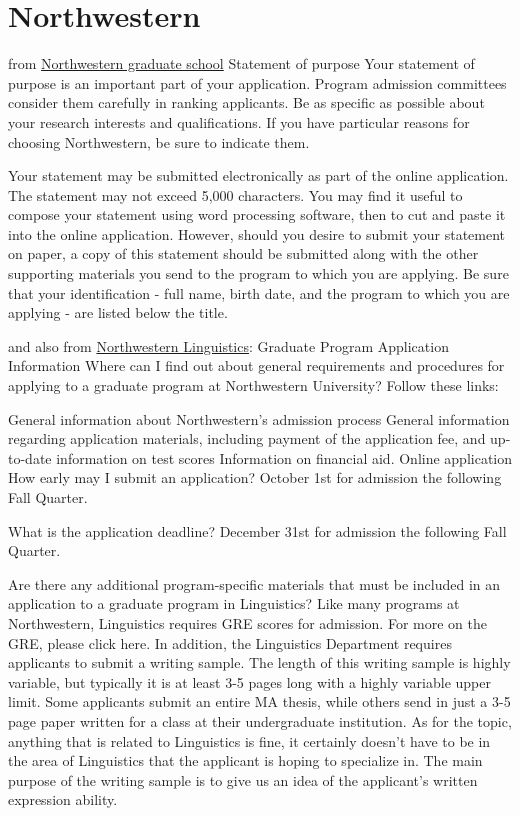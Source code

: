 \documentclass[11pt]{article}
\begin{document}
\section{Northwestern}
from \href{http://www.tgs.northwestern.edu/admission/requirements/}{Northwestern graduate school}
Statement of purpose
Your statement of purpose is an important part of your application.  Program admission committees consider them carefully in ranking applicants.  Be as specific as possible about your research interests and qualifications.  If you have particular reasons for choosing Northwestern, be sure to indicate them.  

Your statement may be submitted electronically as part of the online application.  The statement may not exceed 5,000 characters.  You may find it useful to compose your statement using word processing software, then to cut and paste it into the online application.  However, should you desire to submit your statement on paper, a copy of this statement should be submitted along with the other supporting materials you send to the program to which you are applying.  Be sure that your identification - full name, birth date, and the program to which you are applying - are listed below the title.

and also from \href{http://www.linguistics.northwestern.edu/programs/app-info.html}{Northwestern Linguistics}:
Graduate Program Application Information
Where can I find out about general requirements and procedures for applying to a graduate program at Northwestern University?
Follow these links:

General information about Northwestern's admission process
General information regarding application materials, including payment of the application fee, and up-to-date information on test scores
Information on financial aid.
Online application
How early may I submit an application?
October 1st for admission the following Fall Quarter.

What is the application deadline?
December 31st for admission the following Fall Quarter.

Are there any additional program-specific materials that must be included in an application to a graduate program in Linguistics?
Like many programs at Northwestern, Linguistics requires GRE scores for admission. For more on the GRE, please click here. In addition, the Linguistics Department requires applicants to submit a writing sample. The length of this writing sample is highly variable, but typically it is at least 3-5 pages long with a highly variable upper limit. Some applicants submit an entire MA thesis, while others send in just a 3-5 page paper written for a class at their undergraduate institution. As for the topic, anything that is related to Linguistics is fine, it certainly doesn't have to be in the area of Linguistics that the applicant is hoping to specialize in. The main purpose of the writing sample is to give us an idea of the applicant's written expression ability.
\end{document}
